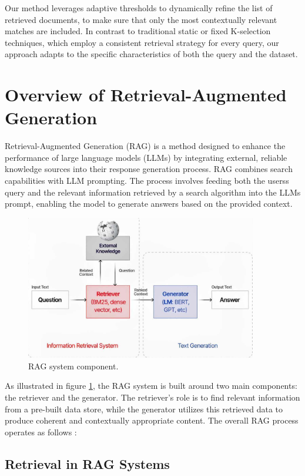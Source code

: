 \documentclass[review]{jair}
\begin{document}
Our method leverages adaptive thresholds to dynamically refine the list of retrieved documents, to make sure that only the most contextually relevant matches are included. In contrast to traditional static or fixed K-selection techniques, which employ a consistent retrieval strategy for every query, our approach adapts to the specific characteristics of both the query and the dataset.

\section{Overview of Retrieval-Augmented Generation }\label{sec3}
Retrieval-Augmented Generation (RAG) is a method designed to enhance the performance of large language models (LLMs) by integrating external, reliable knowledge sources into their response generation process\cite{awsRAG}. RAG combines search capabilities with LLM prompting. The process involves feeding both the userss query and the relevant information retrieved by a search algorithm into the LLMs prompt\cite{ilin2023advancedrag}, enabling the model to generate answers based on the provided context.
\begin{figure}[h]
	\centering
	\includegraphics[width=0.9\textwidth]{rag.JPG}
	\caption{RAG system component\cite{gupta20241}. }\label{rag.PNG}
\end{figure}
As illustrated in figure \ref{rag.PNG}, the RAG system is built around two main components: the retriever and the generator. The retriever's role is to find relevant information from a pre-built data store, while the generator utilizes this retrieved data to produce coherent and contextually appropriate content. The overall RAG process operates as follows :
\subsection{Retrieval in RAG Systems}\label{subsec2}
\end{document}
